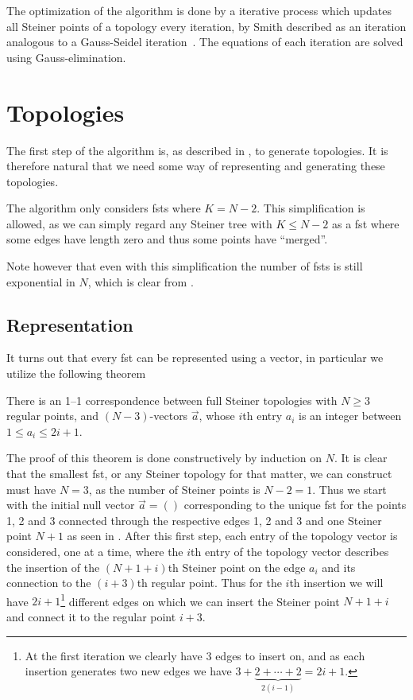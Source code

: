 The optimization of the algorithm is done by a iterative process which updates
all Steiner points of a topology every iteration, by Smith described as an
iteration analogous to a Gauss-Seidel iteration~\cite[p.~145]{Smith1992}. The
equations of each iteration are solved using Gauss-elimination.


\section{Topologies}
\label{sec:topologies}

The first step of the algorithm is, as described in , to
generate topologies. It is therefore natural that we need some way of
representing and generating these topologies.

The algorithm only considers \glspl{fst} where $K = N - 2$. This simplification
is allowed, as we can simply regard any Steiner tree with $K \le N - 2$ as a
\gls{fst} where some edges have length zero and thus some points have
``merged''.

Note however that even with this simplification the number of \glspl{fst} is still
exponential in $N$, which is clear from .

\subsection{Representation}
\label{sec:representation}

It turns out that every \gls{fst} can be represented using a vector, in
particular we utilize the following theorem

\begin{theorem}
There is an 1--1 correspondence between full Steiner topologies with $N \ge 3$
regular points, and $(N-3)$-vectors $\vec{a}$, whose $i$th entry $a_i$ is an
integer between $1 \le a_i \le 2 i + 1$.
\end{theorem}

The proof of this theorem is done constructively by induction on $N$. It is
clear that the smallest \gls{fst}, or any Steiner topology for that matter, we
can construct must have $N = 3$, as the number of Steiner points is $N - 2 = 1$.
Thus we start with the initial null vector $\vec{a} = ()$ corresponding to the
unique \gls{fst} for the points 1, 2 and 3 connected through the respective
edges 1, 2 and 3 and one Steiner point $N+1$ as seen in
. After this first step, each entry of the topology
vector is considered, one at a time, where the $i$th entry of the topology
vector describes the insertion of the $(N+1+i)$th Steiner point on the edge
$a_{i}$ and its connection to the $(i+3)$th regular point. Thus for the $i$th
insertion we will have $2i+1$\footnote{At the first iteration we clearly have 3
  edges to insert on, and as each insertion generates two new edges we have
  $3 + \underbrace{2 + \cdots + 2}_{2 (i - 1)} = 2 i + 1$.} different edges on which we
can insert the Steiner point $N+1+i$ and connect it to the regular point $i+3$.

